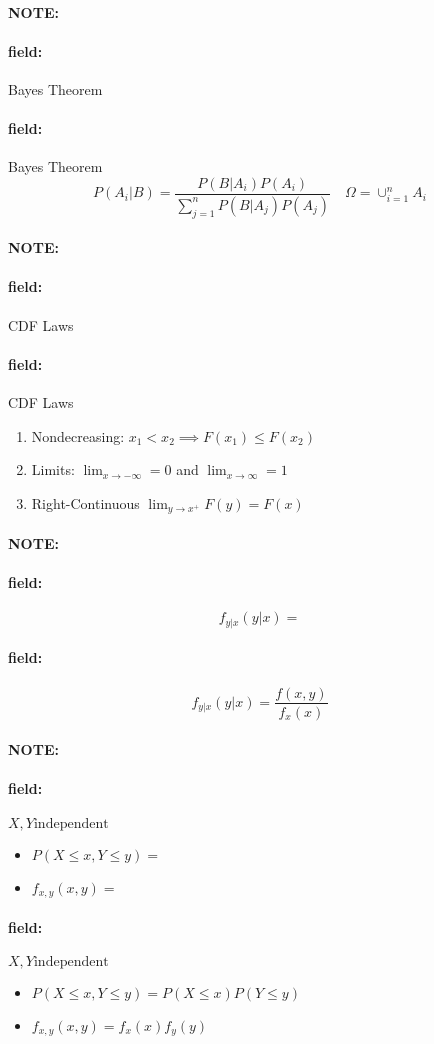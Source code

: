 \documentclass[12pt]{article}
\newenvironment{note}{\paragraph{NOTE:}}{}
\newenvironment{field}{\paragraph{field:}}{}
\begin{document}
\begin{note}
  \begin{field}
    Bayes Theorem
  \end{field}
  \begin{field}
    Bayes Theorem
    $$P(A_i|B) = \frac{P(B|A_i)P(A_i)}{\sum_{j=1}^n P(B|A_j)P(A_j)} \quad \Omega = \cup_{i=1}^n A_i$$
  \end{field}
\end{note}

\begin{note}
  \begin{field}
    CDF Laws
  \end{field}
  \begin{field}
    CDF Laws
    \begin{enumerate}
      \item Nondecreasing: $x_1 < x_2 \implies F(x_1) \leq F(x_2)$
      \item Limits: $\lim_{x \to -\infty}=0$ and $\lim_{x\to \infty} = 1$
      \item Right-Continuous $\lim_{y \to x^+}F(y) = F(x)$
    \end{enumerate}
  \end{field}
\end{note}

\begin{note}
  \begin{field}
    $$f_{y|x}(y|x) = $$
  \end{field}
  \begin{field}
    $$f_{y|x}(y|x) = \frac{f(x,y)}{f_x(x)}$$
  \end{field}
\end{note}

\begin{note}
  \begin{field}
    $X,Y \text{independent}$
    \begin{itemize}
      \item $P(X \leq x, Y \leq y) = $
      \item $f_{x,y}(x,y) = $
    \end{itemize}
  \end{field}
  \begin{field}
    $X,Y \text{independent}$
    \begin{itemize}
      \item $P(X \leq x, Y \leq y) = P(X \leq x)P(Y \leq y)$
      \item $f_{x,y}(x,y) = f_x(x)f_y(y)$
    \end{itemize}
  \end{field}
\end{note}
\end{document}
